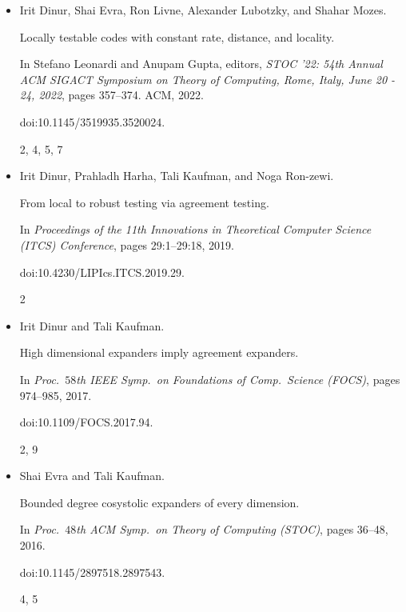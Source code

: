 \documentclass[10pt,a4paper]{article}
\begin{document}
\begin{itemize}
\emph{arXiv preprint}, 2020.


arXiv:2005.01045.


5




\item[] 
[6]

Irit Dinur, Shai Evra, Ron Livne, Alexander Lubotzky, and Shahar Mozes.


Locally testable codes with constant rate, distance, and locality.


In Stefano Leonardi and Anupam Gupta, editors, \emph{STOC ’22: 54th
Annual ACM SIGACT Symposium on Theory of Computing, Rome, Italy, June 20
- 24, 2022}, pages 357–374. ACM, 2022.


doi:10.1145/3519935.3520024.


2, 4, 5, 7




\item[] 
[7]

Irit Dinur, Prahladh Harha, Tali Kaufman, and Noga Ron-zewi.


From local to robust testing via agreement testing.


In \emph{Proceedings of the 11th Innovations in Theoretical Computer
Science (ITCS) Conference}, pages 29:1–29:18, 2019.


doi:10.4230/LIPIcs.ITCS.2019.29.


2




\item[] 
[8]

Irit Dinur and Tali Kaufman.


High dimensional expanders imply agreement expanders.


In \emph{Proc. $58$th IEEE Symp. on Foundations of Comp. Science
(FOCS)}, pages 974–985, 2017.


doi:10.1109/FOCS.2017.94.


2, 9




\item[] 
[9]

Shai Evra and Tali Kaufman.


Bounded degree cosystolic expanders of every dimension.


In \emph{Proc. $48$th ACM Symp. on Theory of Computing (STOC)},
pages 36–48, 2016.


doi:10.1145/2897518.2897543.


4, 5





\end{itemize}
\end{document}
